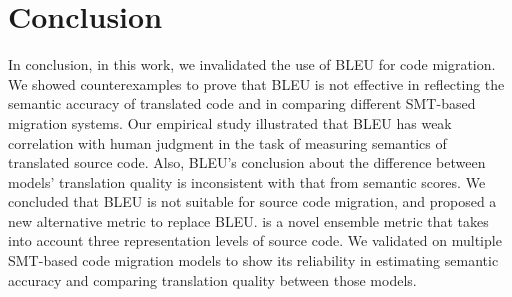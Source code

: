 \section{Conclusion}
In conclusion, in this work, we invalidated the use of BLEU for code
migration. We showed counterexamples to prove that BLEU is not
effective in reflecting the semantic accuracy of translated code and
in comparing different SMT-based migration systems. Our empirical
study illustrated that BLEU has weak correlation with human judgment
in the task of measuring semantics of translated source code. Also,
BLEU's conclusion about the difference between models' translation
quality is inconsistent with that from semantic scores. We concluded that
BLEU is not suitable for source code migration, and proposed a new
alternative metric {\model} to replace BLEU. {\model} is a novel
ensemble metric that takes into account three representation levels of
source code. We validated {\model} on multiple SMT-based code
migration models to show its reliability in estimating semantic
accuracy and comparing translation quality between those models.
